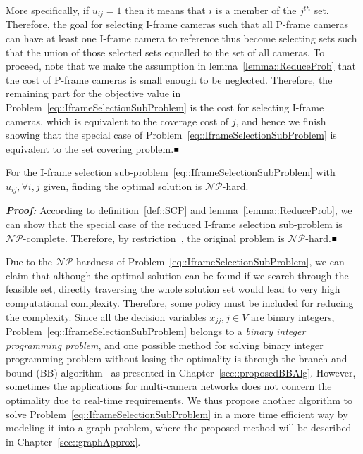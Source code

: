 More specifically, if $u_{ij} = 1$ then it means that $i$ is a member of the $j^{th}$ set.
Therefore, the goal for selecting I-frame cameras such that all P-frame cameras can have at least one I-frame camera to reference thus become selecting sets such that the union of those selected sets equalled to the set of all cameras.
To proceed, note that we make the assumption in lemma~\ref{lemma::ReduceProb} that the cost of P-frame cameras is small enough to be neglected.
Therefore, the remaining part for the objective value in Problem~\eqref{eq::IframeSelectionSubProblem} is the cost for selecting I-frame cameras, which is equivalent to the coverage cost of $j$, and hence we finish showing that the special case of Problem~\eqref{eq::IframeSelectionSubProblem} is equivalent to the set covering problem.\hfill$\mathsmaller{\mathsmaller{\blacksquare}}$

\begin{mythm}
For the I-frame selection sub-problem~\eqref{eq::IframeSelectionSubProblem} with $u_{ij}, \forall i,j$ given, finding the optimal solution is $\mathcal{NP}$-hard.
\end{mythm}
\textbf{\emph{Proof:}}
According to definition~\ref{def::SCP} and lemma~\ref{lemma::ReduceProb}, we can show that the special case of the reduced I-frame selection sub-problem is $\mathcal{NP}$-complete.
Therefore, by restriction~\cite{Restriction}, the original problem is $\mathcal{NP}$-hard.\hfill$\mathsmaller{\mathsmaller{\blacksquare}}$

Due to the $\mathcal{NP}$-hardness of Problem~\eqref{eq::IframeSelectionSubProblem}, we can claim that although the optimal solution can be found if we search through the feasible set, directly traversing the whole solution set would lead to very high computational complexity.
Therefore, some policy must be included for reducing the complexity.
Since all the decision variables ${x_{jj},j \in V}$ are binary integers, Problem~\eqref{eq::IframeSelectionSubProblem} belongs to a \emph{binary integer programming problem}, and one possible method for solving binary integer programming problem without losing the optimality is through the branch-and-bound (BB) algorithm~\cite{BB} as presented in Chapter~\ref{sec::proposedBBAlg}.
However, sometimes the applications for multi-camera networks does not concern the optimality due to real-time requirements.
We thus propose another algorithm to solve Problem~\eqref{eq::IframeSelectionSubProblem} in a more time efficient way by modeling it into a graph problem, where the proposed method will be described in Chapter~\ref{sec::graphApprox}.
%